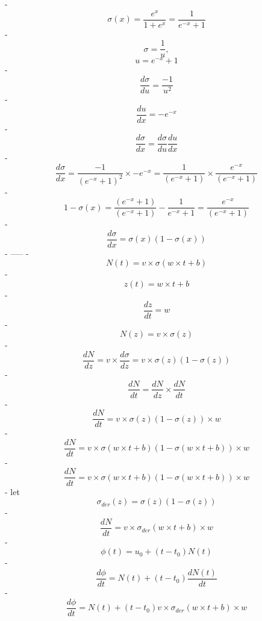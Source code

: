  - $$\sigma(x)=\dfrac{e^{x}}{1+e^{x}}=\dfrac{1}{e^{-x}+1}$$
 - $$\sigma=\dfrac{1}{u},$$$$u=e^{-x}+1$$
 - $$\dfrac{d\sigma}{du}=\dfrac{-1}{u^{2}}$$
 - $$\dfrac{du}{dx}=-e^{-x}$$
 - $$\dfrac{d\sigma}{dx}=\dfrac{d\sigma}{du}\dfrac{du}{dx}$$
 - $$\dfrac{d\sigma}{dx}=\dfrac{-1}{\left(e^{-x}+1\right)^{2}}\times-e^{-x}=\dfrac{1}{\left(e^{-x}+1\right)}\times\dfrac{e^{-x}}{\left(e^{-x}+1\right)}$$
 - $$1-\sigma(x)=\dfrac{\left(e^{-x}+1\right)}{\left(e^{-x}+1\right)}-\dfrac{1}{e^{-x}+1}=\dfrac{e^{-x}}{\left(e^{-x}+1\right)}$$
 - $$\dfrac{d\sigma}{dx}=\sigma(x)(1-\sigma(x))$$
 - -----
 - $$N(t)=v\times\sigma(w\times t+b)$$
 - $$z(t)=w\times t+b$$
 - $$\dfrac{dz}{dt}=w$$
 - $$N(z)=v\times\sigma(z)$$
 - $$\dfrac{dN}{dz}=v\times\dfrac{d\sigma}{dz}=v\times\sigma(z)(1-\sigma(z))$$
 - $$\dfrac{dN}{dt}=\dfrac{dN}{dz}\times\dfrac{dN}{dt}$$
 - $$\dfrac{dN}{dt}=v\times\sigma(z)(1-\sigma(z))\times w$$
 - $$\dfrac{dN}{dt}=v\times\sigma(w\times t+b)(1-\sigma(w\times t+b))\times w$$
 - $$\dfrac{dN}{dt}=v\times\sigma(w\times t+b)(1-\sigma(w\times t+b))\times w$$
 - let $$\sigma_{der}(z)=\sigma(z)(1-\sigma(z))$$
 - $$\dfrac{dN}{dt}=v\times\sigma_{der}(w\times t+b)\times w$$
 - $$\phi(t)=u_{0}+(t-t_{0})N(t)$$
 - $$\dfrac{d\phi}{dt}=N(t)+(t-t_{0})\dfrac{dN(t)}{dt}$$
 - $$\dfrac{d\phi}{dt}=N(t)+(t-t_{0})v\times\sigma_{der}(w\times t+b)\times w$$